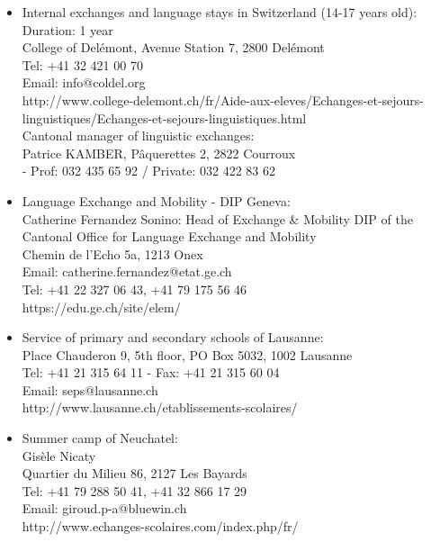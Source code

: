 \begin{itemize}
\vspace{4pt}
\item Internal exchanges and language stays in Switzerland (14-17 years old): \\
Duration: 1 year \\
College of Delémont, Avenue Station 7, 2800 Delémont \\
Tel: +41 32 421 00 70 \\
Email: info@coldel.org \\
http://www.college-delemont.ch/fr/Aide-aux-eleves/Echanges-et-sejours-linguistiques/Echanges-et-sejours-linguistiques.html \\
Cantonal manager of linguistic exchanges: \\
Patrice KAMBER, Pâquerettes 2, 2822 Courroux \\
- Prof: 032 435 65 92 / Private: 032 422 83 62 

\vspace{4pt}
\item Language Exchange and Mobility - DIP Geneva: \\
Catherine Fernandez Sonino: Head of Exchange \& Mobility DIP of the Cantonal Office for Language Exchange and Mobility \\
Chemin de l'Echo 5a, 1213 Onex \\
Email: catherine.fernandez@etat.ge.ch \\
Tel: +41 22 327 06 43, +41 79 175 56 46 \\
https://edu.ge.ch/site/elem/ 

\vspace{4pt}
\item Service of primary and secondary schools of Lausanne: \\
Place Chauderon 9, 5th floor, PO Box 5032, 1002 Lausanne \\
Tel: +41 21 315 64 11 - Fax: +41 21 315 60 04 \\
Email: seps@lausanne.ch \\
http://www.lausanne.ch/etablissements-scolaires/ 

\vspace{4pt}
\item Summer camp of Neuchatel:\\
Gisèle Nicaty \\
Quartier du Milieu 86, 2127 Les Bayards \\
Tel: +41 79 288 50 41, +41 32 866 17 29\\
Email: giroud.p-a@bluewin.ch\\
http://www.echanges-scolaires.com/index.php/fr/


\end{itemize}
